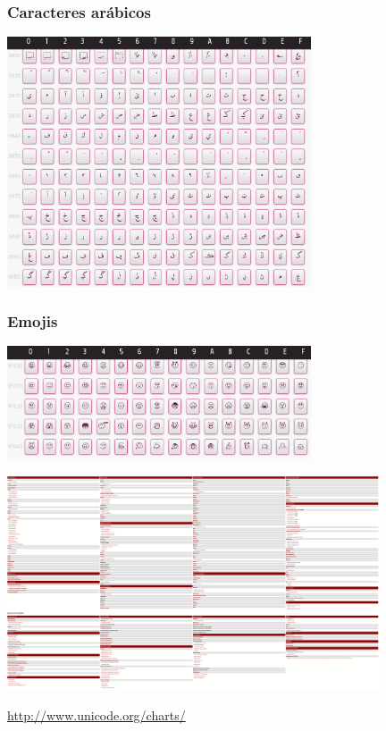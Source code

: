 \begin{frame}
\frametitle{Caracteres arábicos}

\begin{center}
\includegraphics[width=9cm]{figs/unicode-0600}
\end{center}

\end{frame}

\begin{frame}
\frametitle{Emojis}

\begin{center}
\includegraphics[width=9cm]{figs/unicode-emoji}
\end{center}
\end{frame}

\begin{frame}

\begin{center}
\includegraphics[width=11cm]{figs/unicode-charts}
\end{center}

\begin{flushright}
\url{http://www.unicode.org/charts/}
\end{flushright}
\end{frame}

